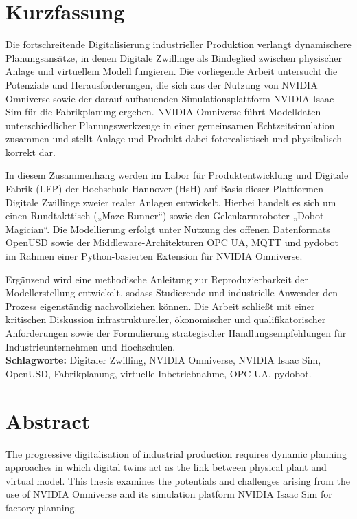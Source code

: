 \newpage
\enlargethispage{3\baselineskip}
\section*{Kurzfassung}
\vspace*{-1em}
Die fortschreitende Digitalisierung industrieller Produktion verlangt dynamischere Planungsansätze, in denen Digitale Zwillinge als Bindeglied zwischen physischer Anlage und virtuellem Modell fungieren. Die vorliegende Arbeit untersucht die Potenziale und Herausforderungen, die sich aus der Nutzung von NVIDIA Omniverse sowie der darauf aufbauenden Simulationsplattform NVIDIA Isaac Sim für die Fabrikplanung ergeben. NVIDIA Omniverse führt Modelldaten unterschiedlicher Planungswerkzeuge in einer gemeinsamen Echtzeitsimulation zusammen und stellt Anlage und Produkt dabei fotorealistisch und physikalisch korrekt dar.

In diesem Zusammenhang werden im Labor für Produktentwicklung und Digitale Fabrik (LFP) der Hochschule Hannover (HsH) auf Basis dieser Plattformen Digitale Zwillinge zweier realer Anlagen entwickelt. Hierbei handelt es sich um einen Rundtakttisch („Maze Runner“) sowie den Gelenkarmroboter „Dobot Magician“. Die Modellierung erfolgt unter Nutzung des offenen Datenformats OpenUSD sowie der Middleware-Architekturen OPC UA, MQTT und pydobot im Rahmen einer Python-basierten Extension für NVIDIA Omniverse.

Ergänzend wird eine methodische Anleitung zur Reproduzierbarkeit der Modellerstellung entwickelt, sodass Studierende und industrielle Anwender den Prozess eigenständig nachvollziehen können. Die Arbeit schließt mit einer kritischen Diskussion infrastruktureller, ökonomischer und qualifikatorischer Anforderungen sowie der Formulierung strategischer Handlungsempfehlungen für Industrieunternehmen und Hochschulen.\\
\textbf{Schlagworte:} Digitaler Zwilling, NVIDIA Omniverse, NVIDIA Isaac Sim, OpenUSD, Fabrikplanung, virtuelle Inbetriebnahme, OPC UA, pydobot.

\vspace{0.1em}
\section*{Abstract}
\vspace*{-1em}
The progressive digitalisation of industrial production requires dynamic planning approaches in which digital twins act as the link between physical plant and virtual model. This thesis examines the potentials and challenges arising from the use of NVIDIA Omniverse and its simulation platform NVIDIA Isaac Sim for factory planning.

